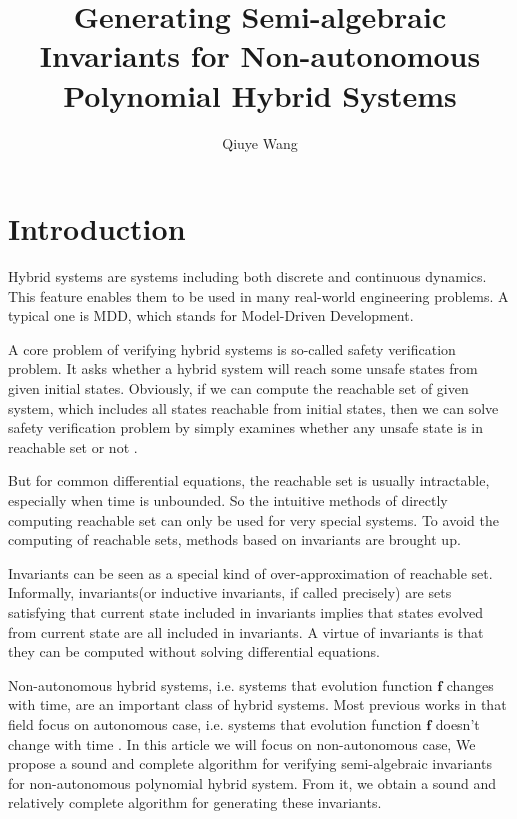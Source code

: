 \documentclass{article}
\title{Generating Semi-algebraic Invariants for Non-autonomous Polynomial Hybrid Systems}
\author{Qiuye Wang}
\begin{document}
\maketitle

\begin{abstract}
\end{abstract}

\section{Introduction}
\label{sec:introduction}
Hybrid systems are systems including both discrete and continuous dynamics. This feature enables them to be used in many real-world engineering problems. A typical one is MDD, which stands for Model-Driven Development\cite{giese2006survey}.

A core problem of verifying hybrid systems is so-called safety verification problem. It asks whether a hybrid system will reach some unsafe states from given initial states. Obviously, if we can compute the reachable set of given system, which includes all states reachable from initial states, then we can solve safety verification problem by simply examines whether any unsafe state is in reachable set or not \cite{clarke2003abstraction}. 

But for common differential equations, the reachable set is usually intractable, especially when time is unbounded. So the intuitive methods of directly computing reachable set can only be used for very special systems. To avoid the computing of reachable sets, methods based on invariants are brought up\cite{sankaranarayanan2004constructing, prajna2004safety}.

Invariants can be seen as a special kind of over-approximation of reachable set. Informally, invariants(or inductive invariants, if called precisely) are sets satisfying that current state included in invariants implies that states evolved from current state are all included in invariants. A virtue of invariants is that they can be computed without solving differential equations.

Non-autonomous hybrid systems, i.e. systems that evolution function $\boldsymbol{f}$ changes with time, are an important class of hybrid systems. Most previous works in that field focus on autonomous case, i.e. systems that evolution function $\boldsymbol{f}$ doesn't change with time \cite{liu2011computing}. In this article we will focus on non-autonomous case, We propose a sound and complete algorithm for verifying semi-algebraic invariants for non-autonomous polynomial hybrid system. From it, we obtain a sound and relatively complete algorithm for generating these invariants.
\end{document}
